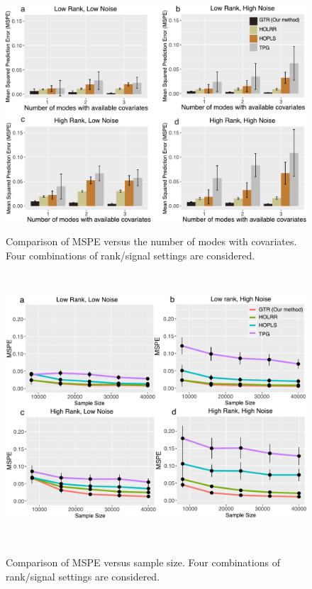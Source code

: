 \documentclass{article}
\theoremstyle{plain}
\theoremstyle{definition}
\begin{document}
\begin{figure}[htbp]
\centering
\begin{minipage}[t]{0.46\textwidth}
\centering
\includegraphics[width=1\textwidth]{merge.pdf}
\caption{\small{Comparison of MSPE versus the number of modes with covariates. Four combinations of rank/signal settings are considered. }}~\label{fig:compare}
\end{minipage}
\hspace{.5cm}
\begin{minipage}[t]{0.46\textwidth}
\centering
\includegraphics[width=1\textwidth]{merge2.pdf}
\caption{\small{Comparison of MSPE versus sample size. Four combinations of rank/signal settings are considered.}}~\label{fig:compare2}
\end{minipage}
\vspace{-.2cm}
\end{figure}
\end{document}
